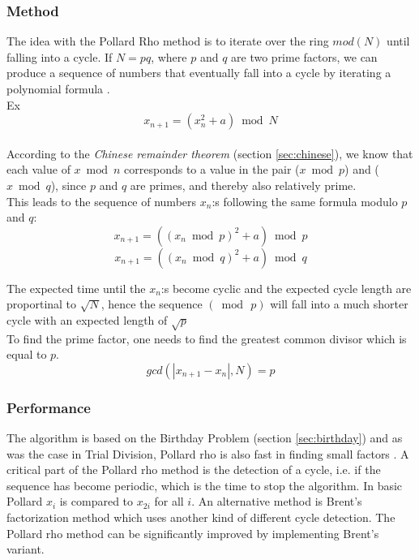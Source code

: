 \documentclass[a4paper, 12pt]{report}
\begin{document}
\subsubsection{Method}
The idea with the Pollard Rho method is to iterate over the ring $mod(N)$ until falling into a cycle. If $N = pq$, where $p$ and $q$ are two prime factors, we can produce a sequence of numbers that eventually fall into a cycle by iterating a polynomial formula \cite{pollard}. \\
Ex 
\begin{equation}
x_{n+1} = (x_n^2 + a) \bmod N
\end{equation} \\
According to the \emph{Chinese remainder theorem} (section \ref{sec:chinese}), we know that each value of $x \bmod n$ corresponds to a value in the pair ($x \bmod p$) and ($x \bmod q$), since $p$ and $q$ are primes, and thereby also relatively prime. 
\\
This leads to the sequence of numbers $x_n$:s following the same formula modulo $p$ and $q$:
\begin{equation}
	x_{n+1} = ((x_n \bmod p)^2 + a) \bmod p
\end{equation}
\begin{equation}
	x_{n+1} = ((x_n \bmod q)^2 + a) \bmod q
\end{equation}

The expected time until the $x_n$:s become cyclic and the expected cycle length are proportinal to $\sqrt{N}$, hence the sequence $(\bmod\,p)$ will fall into a much shorter cycle with an expected length of $\sqrt{p}$
\\
To find the prime factor, one needs to find the greatest common divisor which is equal to $p$.
\begin{equation}
gcd(|x_{n+1} - x_n|, N) = p
\end{equation}

\subsubsection{Performance}
The algorithm is based on the Birthday Problem (section \ref{sec:birthday}) and as was the case in Trial Division, Pollard rho is also fast in finding small factors \cite{pollard}. A critical part of the Pollard rho method is the detection of a cycle, i.e. if the sequence has become periodic, which is the time to stop the algorithm. In basic Pollard $x_i$ is compared to $x_{2i}$ for all $i$. An alternative method is Brent's factorization method which uses another kind of different cycle detection. The Pollard rho method can be significantly improved by implementing Brent's variant.
\end{document}
